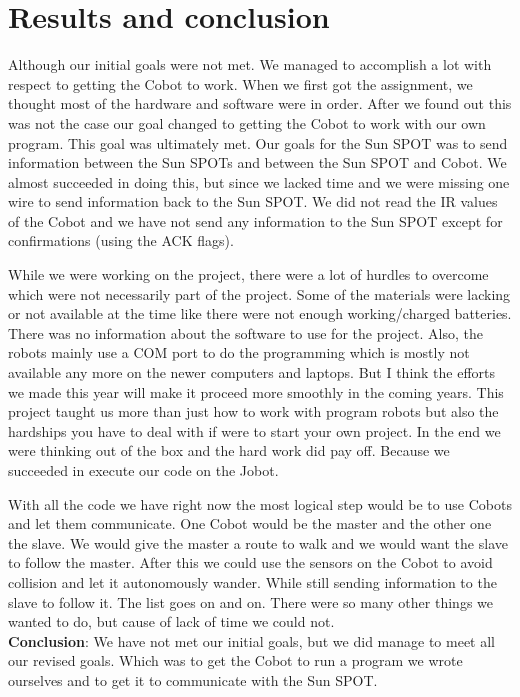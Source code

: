 \documentclass[a4paper,10pt]{article} %
\begin{document}

\section{Results and conclusion} %

Although our initial goals were not met. We managed to accomplish a lot with
respect to getting the Cobot to work. When we first got the assignment, we
thought most of the hardware and software were in order. After we found out this
was not the case our goal changed to getting the Cobot to work with our own
program. This goal was ultimately met. Our goals for the Sun SPOT was to send
information between the Sun SPOTs and between the Sun SPOT and Cobot. We almost
succeeded in doing this, but since we lacked time and we were missing one wire
to send information back to the Sun SPOT. We did not read the IR values of the
Cobot and we have not send any information to the Sun SPOT except for
confirmations (using the ACK flags).

While we were working on the project, there were a lot of hurdles to overcome
which were not necessarily part of the project. Some of the materials were
lacking or not available at the time like there were not enough working/charged
batteries. There was no information about the software to use for the project.
Also, the robots mainly use a COM port to do the programming which is mostly not
available any more on the newer computers and laptops. But I think the efforts
we made this year will make it proceed more smoothly in the coming years. This
project taught us more than just how to work with program robots but also the
hardships you have to deal with if were to start your own project. In the end we
were thinking out of the box and the hard work did pay off. Because we succeeded
in execute our code on the Jobot.

With all the code we have right now the most logical step would be to use Cobots
and let them communicate. One Cobot would be the master and the other one the
slave. We would give the master a route to walk and we would want the slave to
follow the master. After this we could use the sensors on the Cobot to avoid
collision and let it autonomously wander. While still sending information to the
slave to follow it. The list goes on and on. There were so many other things we
wanted to do, but cause of lack of time we could not. \\

\noindent \textbf{Conclusion}: We have not met our initial goals, but we did
manage to meet all our revised goals. Which was to get the Cobot to run a
program we wrote ourselves and to get it to communicate with the Sun SPOT.
\end{document}
